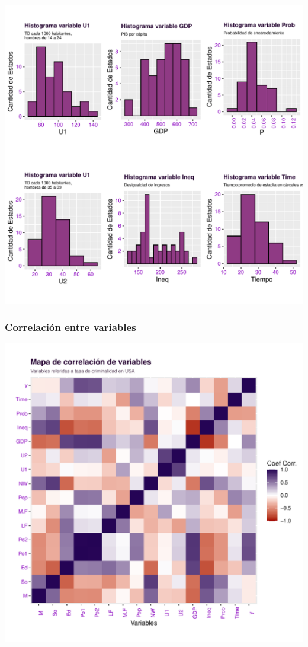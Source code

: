 \documentclass[11pt,a4paper]{article}\usepackage[]{graphicx}\usepackage[]{color}
\makeatletter
\def\maxwidth{ %
  \ifdim\Gin@nat@width>\linewidth
    \linewidth
  \else
    \Gin@nat@width
  \fi
}
\newenvironment{knitrout}{}{} %
\makeatother
\begin{document}
\begin{knitrout}
\color{fgcolor}
\includegraphics[width=\maxwidth]{figure/unnamed-chunk-4-1} 

\end{knitrout}
\newpage

\subsubsection{Correlación entre variables}

\begin{knitrout}
\color{fgcolor}
\includegraphics[width=\maxwidth]{figure/unnamed-chunk-5-1} 

\end{knitrout}
\end{document}
